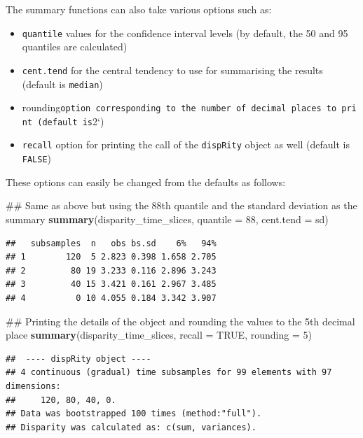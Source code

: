 \documentclass[]{book}
\newenvironment{Shaded}{\begin{snugshade}}{\end{snugshade}}
\newcommand{\KeywordTok}[1]{\textcolor[rgb]{0.13,0.29,0.53}{\textbf{#1}}}
\newcommand{\DataTypeTok}[1]{\textcolor[rgb]{0.13,0.29,0.53}{#1}}
\newcommand{\DecValTok}[1]{\textcolor[rgb]{0.00,0.00,0.81}{#1}}
\newcommand{\OtherTok}[1]{\textcolor[rgb]{0.56,0.35,0.01}{#1}}
\newcommand{\NormalTok}[1]{#1}
\providecommand{\tightlist}{%
  \setlength{\itemsep}{0pt}\setlength{\parskip}{0pt}}
\theoremstyle{definition}
\theoremstyle{definition}
\theoremstyle{remark}
\begin{document}
The summary functions can also take various options such as:

\begin{itemize}
\tightlist
\item
  \texttt{quantile} values for the confidence interval levels (by
  default, the 50 and 95 quantiles are calculated)
\item
  \texttt{cent.tend} for the central tendency to use for summarising the
  results (default is \texttt{median})
\item
  rounding\texttt{option\ corresponding\ to\ the\ number\ of\ decimal\ places\ to\ print\ (default\ is}2`)
\item
  \texttt{recall} option for printing the call of the \texttt{dispRity}
  object as well (default is \texttt{FALSE})
\end{itemize}

These options can easily be changed from the defaults as follows:

\begin{Shaded}
\begin{Highlighting}[]
\NormalTok{## Same as above but using the 88th quantile and the standard deviation as the summary }
\KeywordTok{summary}\NormalTok{(disparity_time_slices, }\DataTypeTok{quantile =} \DecValTok{88}\NormalTok{, }\DataTypeTok{cent.tend =}\NormalTok{ sd)}
\end{Highlighting}
\end{Shaded}

\begin{verbatim}
##   subsamples  n   obs bs.sd    6%   94%
## 1        120  5 2.823 0.398 1.658 2.705
## 2         80 19 3.233 0.116 2.896 3.243
## 3         40 15 3.421 0.161 2.967 3.485
## 4          0 10 4.055 0.184 3.342 3.907
\end{verbatim}

\begin{Shaded}
\begin{Highlighting}[]
\NormalTok{## Printing the details of the object and rounding the values to the 5th decimal place}
\KeywordTok{summary}\NormalTok{(disparity_time_slices, }\DataTypeTok{recall =} \OtherTok{TRUE}\NormalTok{, }\DataTypeTok{rounding =} \DecValTok{5}\NormalTok{)}
\end{Highlighting}
\end{Shaded}

\begin{verbatim}
##  ---- dispRity object ---- 
## 4 continuous (gradual) time subsamples for 99 elements with 97 dimensions:
##     120, 80, 40, 0.
## Data was bootstrapped 100 times (method:"full").
## Disparity was calculated as: c(sum, variances).
\end{verbatim}
\end{document}
